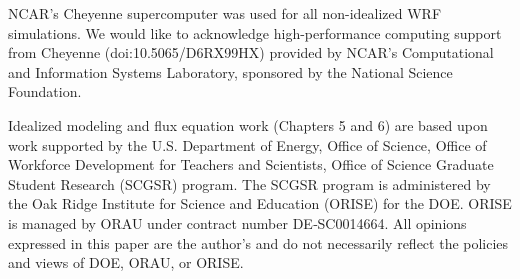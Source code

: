 


NCAR's Cheyenne supercomputer was used for all non-idealized WRF simulations. We would like to acknowledge high-performance computing support from Cheyenne (doi:10.5065/D6RX99HX) provided by NCAR's Computational and Information Systems Laboratory, sponsored by the National Science Foundation.

Idealized modeling and flux equation work (Chapters 5 and 6) are based upon work supported by the U.S. Department of Energy, Office of Science, Office of Workforce Development for Teachers and Scientists, Office of Science Graduate Student Research (SCGSR) program. The SCGSR program is administered by the Oak Ridge Institute for Science and Education (ORISE) for the DOE. ORISE is managed by ORAU under contract number DE‐SC0014664. All opinions expressed in this paper are the author’s and do not necessarily reflect the policies and views of DOE, ORAU, or ORISE.


